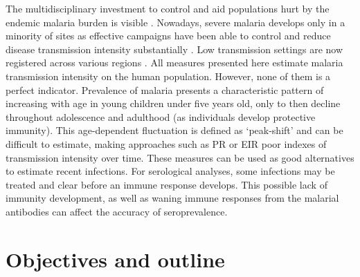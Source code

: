 The multidisciplinary investment to control and aid populations hurt by the endemic malaria burden is visible \cite{who2017world}.
Nowadays, severe malaria develops only in a minority of sites as effective campaigns have been able to control and reduce disease transmission intensity substantially \cite{marsh1995indicators}.
Low transmission settings are now registered across various regions \cite{cook2010using}.
All measures presented here estimate malaria transmission intensity on the human population.
However, none of them is a perfect indicator.
Prevalence of malaria presents a characteristic pattern of increasing with age in young children under five years old, only to then decline throughout adolescence and adulthood (as individuals develop protective immunity).
This age-dependent fluctuation is defined as `peak-shift' and can be difficult to estimate, making approaches such as PR or EIR poor indexes of transmission intensity over time.
These measures can be used as good alternatives to estimate recent infections.
For serological analyses, some infections may be treated and clear before an immune response develops.
This possible lack of immunity development, as well as waning immune responses from the malarial antibodies can affect the accuracy of seroprevalence.

\section{Objectives and outline}
\label{seq:objectives}

